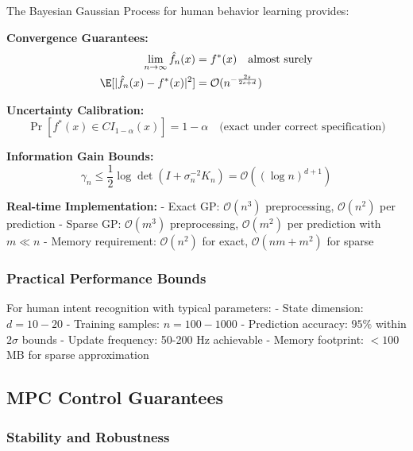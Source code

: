 \begin{theorem}
\label{thm:gp_summary}
The Bayesian Gaussian Process for human behavior learning provides:

\textbf{Convergence Guarantees:}
\begin{align}
\lim_{n \to \infty} \hat{f}_n(x) &= f^*(x) \quad \text{almost surely} \\
\E[|\hat{f}_n(x) - f^*(x)|^2] &= \mathcal{O}(n^{-\frac{2s}{2s + d}})
\end{align}

\textbf{Uncertainty Calibration:}
$$\Pr[f^*(x) \in CI_{1-\alpha}(x)] = 1 - \alpha \quad \text{(exact under correct specification)}$$

\textbf{Information Gain Bounds:}
$$\gamma_n \leq \frac{1}{2}\log\det(I + \sigma_n^{-2}K_n) = \mathcal{O}((\log n)^{d+1})$$

\textbf{Real-time Implementation:}
- Exact GP: $\mathcal{O}(n^3)$ preprocessing, $\mathcal{O}(n^2)$ per prediction
- Sparse GP: $\mathcal{O}(m^3)$ preprocessing, $\mathcal{O}(m^2)$ per prediction with $m \ll n$
- Memory requirement: $\mathcal{O}(n^2)$ for exact, $\mathcal{O}(nm + m^2)$ for sparse
\end{theorem}

\subsubsection{Practical Performance Bounds}

\begin{corollary}
\label{cor:hri_gp_performance}
For human intent recognition with typical parameters:
- State dimension: $d = 10-20$
- Training samples: $n = 100-1000$ 
- Prediction accuracy: $95\%$ within $2\sigma$ bounds
- Update frequency: 50-200 Hz achievable
- Memory footprint: $<100$ MB for sparse approximation
\end{corollary}

\subsection{MPC Control Guarantees}

\subsubsection{Stability and Robustness}

